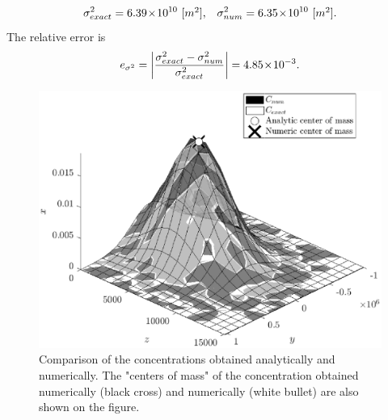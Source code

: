 \begin{equation}
	\sigma^2_{exact} = 6.39\!\times\!10^{10} \mbox{ [$m^2$],}\quad \sigma^2_{num} = 6.35\!\times\!10^{10} \mbox{ [$m^2$].}
\end{equation}
The relative error is
\begin{equation}
	e_{\sigma^2} = \left \lvert \frac{\sigma^2_{exact}-\sigma^2_{num}}{\sigma^2_{exact}}\right \rvert = 4.85\!\times\!10^{-3}.
\end{equation}
\begin{figure}[H]
	\centering
	\includegraphics[width = \textwidth]{fig/testcase/testcaseSI_surf.eps}
	\caption{Comparison of the concentrations obtained analytically and numerically. The "centers of mass" of the concentration obtained numerically (black cross) and numerically (white bullet) are also shown on the figure.}
	\label{fig:testcaseSI_surf}
\end{figure}
